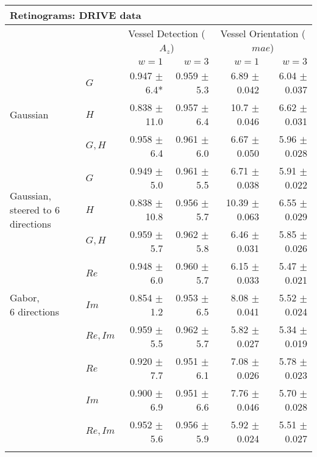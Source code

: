 \begin{tabularx}{\linewidth}{X X r r r r}
\toprule
\multicolumn{6}{l}{Retinograms: DRIVE data} \\
\midrule
            &
            & \multicolumn{2}{c}{Vessel Detection \linebreak ($A_z$)}
            & \multicolumn{2}{c}{Vessel Orientation \linebreak ($mae$)}  \\
            &           & $w = 1$         & $w = 3$         &   $w = 1$       &   $w = 3$   \\
\midrule
\multirow{3}{3cm}{ Gaussian }
            & $G$         & 0.947 $\pm$ 6.4* & 0.959 $\pm$ 5.3   & 6.89 $\pm$ 0.042  & 6.04 $\pm$ 0.037 \\
            & $H$         & 0.838 $\pm$ 11.0& 0.957 $\pm$ 6.4   & 10.7 $\pm$ 0.046  & 6.62 $\pm$ 0.031 \\
            & $G, H$      & 0.958 $\pm$ 6.4 & 0.961 $\pm$ 6.0  & 6.67 $\pm$ 0.050  & 5.96 $\pm$ 0.028 \\
\midrule
\multirow{3}{3cm}{Gaussian, \newline steered to 6 directions}
            & $G$         & 0.949 $\pm$ 5.0 & 0.961 $\pm$ 5.5  & 6.71 $\pm$ 0.038  & 5.91 $\pm$ 0.022 \\
            & $H$         & 0.838 $\pm$ 10.8& 0.956 $\pm$ 5.7   & 10.39 $\pm$ 0.063  & 6.55 $\pm$ 0.029 \\
            & $G,H$       & 0.959 $\pm$ 5.7 & 0.962 $\pm$ 5.8  & 6.46 $\pm$ 0.031  & 5.85 $\pm$ 0.026 \\
\midrule
\multirow{3}{3cm}{Gabor, \newline 6 directions}
            & $Re$      & 0.948 $\pm$ 6.0   & 0.960 $\pm$ 5.7  & 6.15 $\pm$ 0.033 & 5.47 $\pm$ 0.021 \\
            & $Im$      & 0.854 $\pm$ 1.2   & 0.953 $\pm$ 6.5   & 8.08 $\pm$ 0.041 & 5.52 $\pm$ 0.024 \\
            & $Re,Im$   & 0.959 $\pm$ 5.5   & 0.962 $\pm$ 5.7  & 5.82 $\pm$ 0.027 & 5.34 $\pm$ 0.019 \\
\midrule
\multirow{3}{3cm}{\dtcwt{}}
            & $Re$      & 0.920 $\pm$ 7.7   & 0.951 $\pm$ 6.1  & 7.08 $\pm$ 0.026 & 5.78 $\pm$ 0.023 \\
            & $Im$      & 0.900 $\pm$ 6.9   & 0.951 $\pm$ 6.6  & 7.76 $\pm$ 0.046 & 5.70 $\pm$ 0.028 \\
            & $Re,Im$   & 0.952 $\pm$ 5.6   & 0.956 $\pm$ 5.9  & 5.92 $\pm$ 0.024 & 5.51 $\pm$ 0.027 \\

\bottomrule
\noalign{\smallskip}
\end{tabularx}
